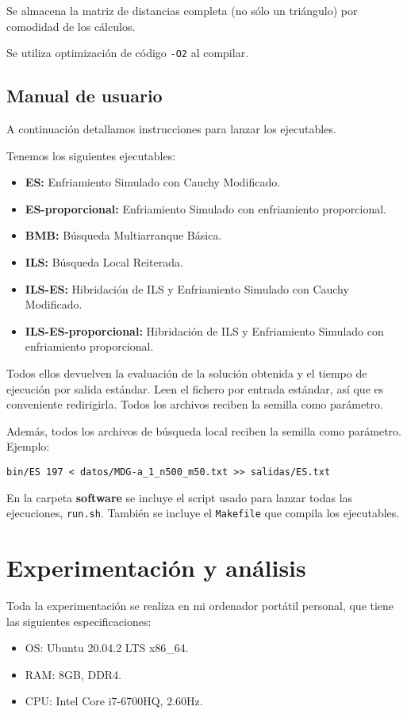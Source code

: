 \documentclass{article}
\begin{document}
Se almacena la matriz de distancias completa (no sólo un triángulo) por comodidad de los cálculos.

Se utiliza optimización de código \texttt{-O2} al compilar.

\subsection{Manual de usuario}

A continuación detallamos instrucciones para lanzar los ejecutables.

Tenemos los siguientes ejecutables:

\begin{itemize}
\item \textbf{ES:} Enfriamiento Simulado con Cauchy Modificado.
\item \textbf{ES-proporcional:} Enfriamiento Simulado con enfriamiento proporcional.
\item \textbf{BMB:} Búsqueda Multiarranque Básica.
\item \textbf{ILS:} Búsqueda Local Reiterada.
\item \textbf{ILS-ES:} Hibridación de ILS y Enfriamiento Simulado con Cauchy Modificado.
\item \textbf{ILS-ES-proporcional:} Hibridación de ILS y Enfriamiento Simulado con enfriamiento proporcional. 
\end{itemize}

Todos ellos devuelven la evaluación de la solución obtenida y el tiempo de ejecución por salida estándar.
Leen el fichero por entrada estándar, así que es conveniente redirigirla.
Todos los archivos reciben la semilla como parámetro.

Además, todos los archivos de búsqueda local reciben la semilla como parámetro. Ejemplo:
\begin{verbatim}
bin/ES 197 < datos/MDG-a_1_n500_m50.txt >> salidas/ES.txt
\end{verbatim}

En la carpeta \textbf{software} se incluye el script usado para lanzar todas las ejecuciones, \texttt{run.sh}. También se incluye
el \texttt{Makefile} que compila los ejecutables.

\pagebreak

\section{Experimentación y análisis}

Toda la experimentación se realiza en mi ordenador portátil personal, que tiene las siguientes especificaciones:
\begin{itemize}
	\item OS: Ubuntu 20.04.2 LTS x86\_64.
	\item RAM: 8GB, DDR4.
	\item CPU: Intel Core i7-6700HQ, 2.60Hz.
\end{itemize}
\end{document}
